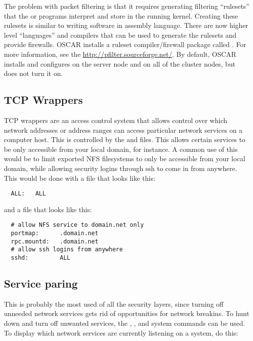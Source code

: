 The problem with packet filtering is that it requires generating
filtering ``rulesets'' that the  or 
programs interpret and store in the running kernel.  Creating these
rulesets is similar to writing software in assembly language. There
are now higher level ``languages'' and compilers that can be used to
generate the rulesets and provide firewalls.  OSCAR installs a ruleset
compiler/firewall package called .  For more
information, see the \url{http://pfilter.sourceforge.net/}.  By
default, OSCAR installs and configures  on the server
node and on all of the cluster nodes, but does not turn it on.

\subsection{TCP Wrappers}

TCP wrappers are an access control system that allows control over which
network addresses or address ranges can access particular network services
on a computer host.  This is controlled by the  and
 files. This allows certain services to be only 
accessible from your local domain, for instance.  A common use of this
would be to limit exported NFS filesystems to only be accessible from
your local domain, while allowing security logins through ssh to come
in from anywhere.  This would be done with a  file 
that looks like this:

\begin{verbatim}
  ALL:   ALL
\end{verbatim}

\noindent and a  file that looks like this:

\begin{verbatim}
  # allow NFS service to domain.net only
  portmap:      .domain.net
  rpc.mountd:   .domain.net
  # allow ssh logins from anywhere
  sshd:         ALL
\end{verbatim}

\subsection{Service paring}

This is probably the most used of all the security layers, since
turning off unneeded network services gets rid of opportunities for
network breakins.  To hunt down and turn off unwanted services, the
, , and  system commands can be
used.  To display which network services are currently listening on a
system, do this:

